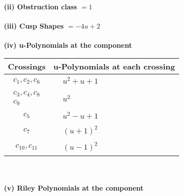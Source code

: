 \documentclass[1p]{elsarticle_modified}
\theoremstyle{definition}
\begin{document}
\flushleft \textbf{(ii) Obstruction class $= 1$}\\~\\
\flushleft \textbf{(iii) Cusp Shapes $= -4 u+2$}\\~\\
\newpage\renewcommand{\arraystretch}{1}
\flushleft \textbf{(iv) u-Polynomials at the component}\newline \\
\begin{tabular}{m{50pt}|m{274pt}}
Crossings & \hspace{64pt}u-Polynomials at each crossing \\
\hline $$\begin{aligned}c_{1},c_{2},c_{6}\end{aligned}$$&$\begin{aligned}
&u^2+u+1
\end{aligned}$\\
\hline $$\begin{aligned}c_{3},c_{4},c_{8}\\c_{9}\end{aligned}$$&$\begin{aligned}
&u^2
\end{aligned}$\\
\hline $$\begin{aligned}c_{5}\end{aligned}$$&$\begin{aligned}
&u^2- u+1
\end{aligned}$\\
\hline $$\begin{aligned}c_{7}\end{aligned}$$&$\begin{aligned}
&(u+1)^2
\end{aligned}$\\
\hline $$\begin{aligned}c_{10},c_{11}\end{aligned}$$&$\begin{aligned}
&(u-1)^2
\end{aligned}$\\
\hline
\end{tabular}\\~\\
\newpage\renewcommand{\arraystretch}{1}
\flushleft \textbf{(v) Riley Polynomials at the component}\newline \\
\end{document}
